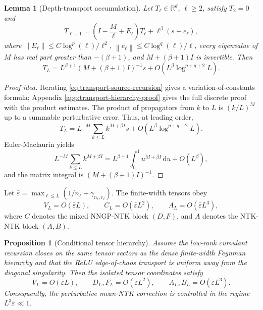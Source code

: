 \documentclass{article}
\newtheorem{proposition}[theorem]{Proposition}
\newtheorem{lemma}[theorem]{Lemma}
\newcommand{\R}{\mathbb R}
\newcommand{\barE}{\bar\varepsilon}
\newcommand{\dd}{\mathrm d}
\newcommand{\norm}[1]{\left\lVert #1\right\rVert}
\begin{document}
\begin{lemma}[Depth-transport accumulation]
\label{lem:transport-source}
Let \(T_\ell\in\R^d\), \(\ell\ge2\), satisfy \(T_2=0\) and
\begin{equation}
T_{\ell+1}
=\left(I-\frac{M}{\ell}+E_\ell\right)T_\ell+\ell^\beta(s+e_\ell),
\label{eq:transport-source-recursion}
\end{equation}
where \(\norm{E_\ell}\le C\log^p(\ell)/\ell^2\), \(\norm{e_\ell}\le C\log^q(\ell)/\ell\), every eigenvalue of \(M\) has real part greater than \(-(\beta+1)\), and \(M+(\beta+1)I\) is invertible. Then
\begin{equation}
T_L
=L^{\beta+1}\left(M+(\beta+1)I\right)^{-1}s
+O\left(L^\beta\log^{p+q+2}L\right).
\label{eq:transport-source-solution}
\end{equation}
\end{lemma}

\begin{proof}[Proof idea]
Iterating \eqref{eq:transport-source-recursion} gives a variation-of-constants formula; Appendix \ref{app:transport-hierarchy-proof} gives the full discrete proof with the product estimates. The product of propagators from \(k\) to \(L\) is \((k/L)^M\) up to a summable perturbative error. Thus, at leading order,
\[
T_L=L^{-M}\sum_{k\le L} k^{M+\beta I}s+O(L^\beta\log^{p+q+2}L).
\]
Euler-Maclaurin yields
\[
L^{-M}\sum_{k\le L} k^{M+\beta I}
=L^{\beta+1}\int_0^1u^{M+\beta I}\,\dd u+O(L^\beta),
\]
and the matrix integral is \((M+(\beta+1)I)^{-1}\).
\end{proof}

Let \(\barE=\max_{\ell\le L}(1/n_\ell+\gamma_{n_\ell,r_\ell})\). The finite-width tensors obey
\begin{equation}
V_L=O(\barE L),\qquad C_L=O(\barE L^2),\qquad A_L=O(\barE L^3),
\label{eq:main-scales}
\end{equation}
where \(C\) denotes the mixed NNGP-NTK block \((D,F)\), and \(A\) denotes the NTK-NTK block \((A,B)\).

\begin{proposition}[Conditional tensor hierarchy]
\label{prop:tensor-hierarchy}
Assume the low-rank cumulant recursion closes on the same tensor sectors as the dense finite-width Feynman hierarchy and that the ReLU edge-of-chaos transport is uniform away from the diagonal singularity. Then the isolated tensor coordinates satisfy
\begin{equation}
V_L=O(\barE L),\qquad
D_L,F_L=O(\barE L^2),\qquad
A_L,B_L=O(\barE L^3).
\label{eq:tensor-hierarchy}
\end{equation}
Consequently, the perturbative mean-NTK correction is controlled in the regime \(L^3\barE\ll 1\).
\end{proposition}
\end{document}
